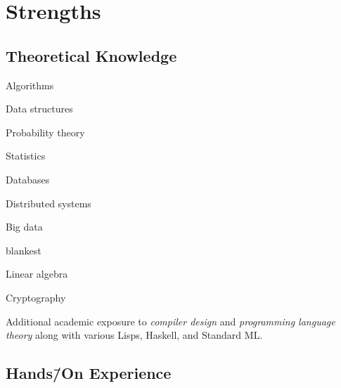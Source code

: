 \documentclass[%
version=last,%
fontsize=11pt,%
paper=A4,%
headinclude=false,%
footinclude=false,%
headlines=0,%
footlines=0,%
areasetadvanced,%
toc=bibnumbered,%
]{scrartcl}%
\begin{document}
\begin{minipage}[t]{.4\textwidth}
  \section{Strengths}%
  \label{sec:strengths}

  \subsection{Theoretical Knowledge}%
  \label{sec:theoretical-knowledge}

  \begin{UniformTCBRaster}{2}
    \begin{TCBItems}
    \item Algorithms
    \item Data structures
    \end{TCBItems}
    \begin{TCBItems}
    \item Probability theory
    \item Statistics
    \end{TCBItems}
    \begin{TCBItems}
    \item Databases
    \item Distributed systems
    \item Big data
    \end{TCBItems}
    \begin{tcboxedraster}[raster columns=1]{blankest}
      \begin{tcolorbox}
        Linear algebra
      \end{tcolorbox}
      \begin{tcolorbox}
        Cryptography
      \end{tcolorbox}
    \end{tcboxedraster}
  \end{UniformTCBRaster}
  \begingroup%
  \small%
  Additional academic exposure to \emph{compiler design} and \emph{programming
    language theory} along with various Lisps, Haskell, and Standard ML\@.\par%
  \endgroup%

  \subsection{%
    \texorpdfstring%
    {Hands\=/On Experience}%
    {Hands-On Experience}%
  }%
  \label{sec:hands-on-experience}


\end{minipage}
\end{document}
